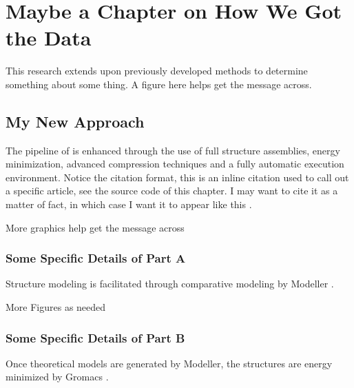 %
%
%



\pagestyle{plain}
\chapter{Maybe a Chapter on How We Got the Data}
\renewcommand{\thetable}{\arabic{chapter}.\arabic{table}}  
\renewcommand{\thefigure}{\arabic{chapter}.\arabic{figure}} 

This research extends upon previously developed methods to determine something about some thing. A figure here helps get the message across.

\section{My New Approach}
The pipeline of \citet{Stieh2013} is enhanced through the use of full structure assemblies, energy minimization, advanced compression techniques and a fully automatic execution environment. Notice the citation format, this is an inline citation used to call out a specific article, see the source code of this chapter. I may want to cite it as a matter of fact, in which case I want it to appear like this \citep{Stieh2013}. 

More graphics help get the message across

\subsection{Some Specific Details of Part A}
Structure modeling is facilitated through comparative modeling by Modeller \citep{Sali1993}. 

More Figures as needed
\subsection{Some Specific Details of Part B}
Once theoretical models are generated by Modeller, the structures are energy minimized by Gromacs \citep{Berendsen1995, Lindahl2001}.

